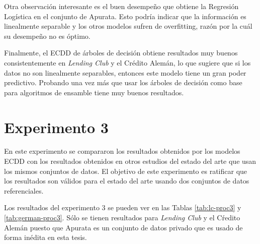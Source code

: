Otra observación interesante es el buen desempeño que obtiene la Regresión Logística en el conjunto de Apurata. Esto podría indicar que la información es linealmente separable y los otros modelos sufren de overfitting, razón por la cuál su desempeño no es óptimo.

Finalmente, el \ac{ECDD} de árboles de decisión obtiene resultados muy buenos consistentemente en \textit{Lending Club} y el Crédito Alemán, lo que sugiere que si los datos no son linealmente separables, entonces este modelo tiene un gran poder predictivo. Probando una vez más que usar los árboles de decisión como base para algoritmos de ensamble tiene muy buenos resultados.



\section{Experimento 3} %

En este experimento se compararon los resultados obtenidos por los modelos \ac{ECDD} con los resultados obtenidos en otros estudios del estado del arte que usan los mismos conjuntos de datos. El objetivo de este experimento es ratificar que los resultados son válidos para el estado del arte usando dos conjuntos de datos referenciales.

Los resultados del experimento 3 se pueden ver en las Tablas \ref{tab:lc-proc3} y \ref{tab:german-proc3}. Sólo se tienen resultados para \textit{Lending Club} y el Cŕedito Alemán puesto que Apurata es un conjunto de datos privado que es usado de forma inédita en esta tesis.


